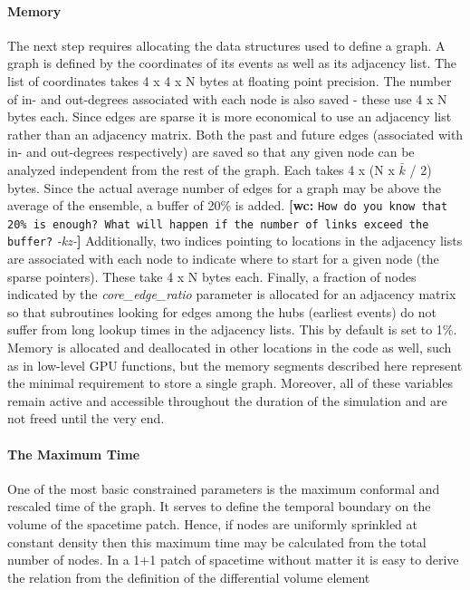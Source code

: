 \documentclass[preprint,notitlepage,amsmath,amssymb,floatfix]{revtex4-1}
\newcommand{\XXX}[3]{{\bf [#1: } {\tt #3} {\it -#2-}{\bf ]}}
\begin{document}
\paragraph{Memory}
The next step requires allocating the data structures used to define a graph.  
A graph is defined by the coordinates of its events as well as its adjacency list.  
The list of coordinates takes 4 x 4 x N bytes at floating point precision.
The number of in- and out-degrees associated with each node is also saved - these use 4 x N bytes each.
Since edges are sparse it is more economical to use an adjacency list rather than an adjacency matrix.
Both the past and future edges (associated with in- and out-degrees respectively) are saved so that any given node can be analyzed independent from the rest of the graph.  
Each takes 4 x (N x $\bar k$ / 2) bytes.  
Since the actual average number of edges for a graph may be above the average of the ensemble, a buffer of 20\% is added. \XXX{wc}{kz}{How do you know that 20\% is enough? What will happen if the number of links exceed the buffer?}
Additionally, two indices pointing to locations in the adjacency lists are associated with each node to indicate where to start for a given node (the sparse pointers).
These take 4 x N bytes each.
Finally, a fraction of nodes indicated by the \textit{core\_edge\_ratio} parameter is allocated for an adjacency matrix so that subroutines looking for edges among the hubs (earliest events) do not suffer from long lookup times in the adjacency lists.  
This by default is set to 1\%.
Memory is allocated and deallocated in other locations in the code as well, such as in low-level GPU functions, but the memory segments described here represent the minimal requirement to store a single graph.
Moreover, all of these variables remain active and accessible throughout the duration of the simulation and are not freed until the very end.
\paragraph{The Maximum Time}
One of the most basic constrained parameters is the maximum conformal and rescaled time of the graph.
It serves to define the temporal boundary on the volume of the spacetime patch.  
Hence, if nodes are uniformly sprinkled at constant density then this maximum time may be calculated from the total number of nodes.
In a 1+1 patch of spacetime without matter it is easy to derive the relation from the definition of the differential volume element
\end{document}
